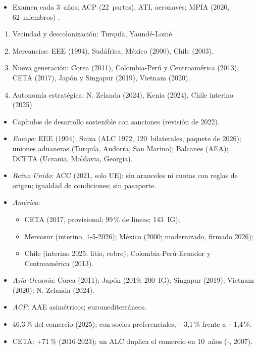\documentclass{article}
\begin{document}
\begin{columnas}
\begin{itemize}
\item Examen cada 3~años; ACP (22~partes), ATI, aeronaves; MPIA (2020, 62~miembros)  .
\end{itemize}

\begin{enumerate}
\item Vecindad y descolonización: Turquía, Yaundé-Lomé.
\item Mercancías: EEE (1994), Sudáfrica, México (2000), Chile (2003).
\item Nueva generación: Corea (2011), Colombia-Perú y Centroamérica (2013), CETA (2017), Japón y Singapur (2019), Vietnam (2020).
\item Autonomía estratégica: N. Zelanda (2024), Kenia (2024), Chile interino (2025).
\end{enumerate}
\begin{itemize}
\item Capítulos de desarrollo sostenible con sanciones (revisión de 2022).
\end{itemize}
\begin{itemize}
\item \emph{Europa}: EEE (1994); Suiza (ALC 1972, 120~bilaterales, paquete de 2026); uniones aduaneras (Turquía, Andorra, San Marino); Balcanes (AEA); DCFTA (Ucrania, Moldavia, Georgia).
\item \emph{Reino Unido}: ACC (2021, solo UE): sin aranceles ni cuotas con reglas de origen; igualdad de condiciones; sin pasaporte.
\item \emph{América}:
  \begin{itemize}
  \item CETA (2017, provisional; 99\,\% de líneas; 143~IG);
  \item Mercosur (interino, 1-5-2026); México (2000; modernizado, firmado 2026);
  \item Chile (interino 2025: litio, cobre); Colombia-Perú-Ecuador y Centroamérica (2013).
  \end{itemize}
\item \emph{Asia-Oceanía}: Corea (2011); Japón (2019; 200~IG); Singapur (2019); Vietnam (2020); N. Zelanda (2024).
\item \emph{ACP}: AAE asimétricos; euromediterráneos.
\end{itemize}
\begin{itemize}
\item 46,3\,\% del comercio (2025); con socios preferenciales, +3,1\,\% frente a +1,4\,\%.
\item CETA: +71\,\% (2016-2023); un ALC duplica el comercio en 10~años (-, 2007).
\end{itemize}


\end{columnas}
\end{document}
